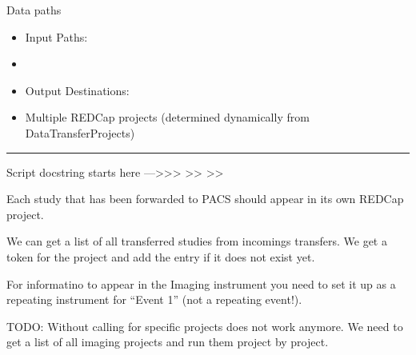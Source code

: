 \documentclass[letterpaper,10pt,english]{sphinxmanual}
\begin{document}
\sphinxAtStartPar
{}


\sphinxAtStartPar
{}


\sphinxAtStartPar
Data paths
\begin{itemize}
\item {} 
\sphinxAtStartPar
Input Paths:

\end{itemize}
\begin{itemize}
\item {} 
\sphinxAtStartPar
{}

\end{itemize}
\begin{itemize}
\item {} 
\sphinxAtStartPar
Output Destinations:

\end{itemize}
\begin{itemize}
\item {} 
\sphinxAtStartPar
Multiple REDCap projects (determined dynamically from DataTransferProjects)

\end{itemize}


\bigskip\hrule\bigskip


\sphinxAtStartPar
Script docstring starts here —\textgreater{}\textgreater{}\textgreater{}
\textendash{}\textgreater{}\textgreater{}
\textendash{}\textgreater{}\textgreater{}

\sphinxAtStartPar
Each study that has been forwarded to PACS should appear in its own REDCap project.

\sphinxAtStartPar
We can get a list of all transferred studies from incomings transfers. We get a token for the project and add the entry \sphinxhyphen{} if it does not exist yet.

\sphinxAtStartPar
For informatino to appear in the Imaging instrument you need to set it up as a repeating instrument for “Event 1” (not a repeating event!).

\sphinxAtStartPar
TODO: Without calling for specific projects does not work anymore. We need to get a list of all imaging projects and run them project by project.
\end{document}
